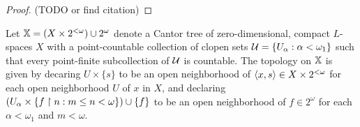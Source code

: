 \begin{proof}
  (TODO or find citation)
\end{proof}

\begin{defn}
  Let $\mathbb{X}=(X\times 2^{<\omega})\cup 2^\omega$ denote a Cantor tree
  of zero-dimensional, compact $L$-spaces $X$ with a point-countable collection
  of clopen sets $\mathcal{U}=\{U_\alpha:\alpha<\omega_1\}$ such
  that every point-finite subcollection of $\mathcal{U}$ is countable.
  The topology on $\mathbb{X}$ is
  given by decaring $U\times\{s\}$ to be an open
  neighborhood of $\langle x,s\rangle\in X\times 2^{<\omega}$ for each
  open neighborhood $U$ of $x$ in $X$, and declaring
  $(U_\alpha\times\{f\restriction n: m\leq n<\omega\})\cup\{f\}$ to be an open
  neighborhood of $f\in 2^\omega$ for each $\alpha<\omega_1$ and $m<\omega$.
\end{defn}











